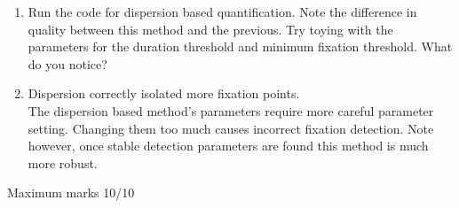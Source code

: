 \documentclass[12pt,english]{scrartcl}
\begin{document}
\begin{enumerate}
 \color{black}
 \item Run the code for dispersion based quantification. Note the difference in quality between this method and the previous. Try toying with the parameters for the duration threshold and minimum fixation threshold. What do you notice? \\
 \item[]
 \color{blue}
 Dispersion correctly isolated more fixation points. \\
 
 The dispersion based method's parameters require more careful parameter setting. Changing them too much causes incorrect fixation detection. Note however, once stable detection parameters are found this method is much more robust.
  

 \end{enumerate}
 \color{black}
 Maximum marks 10/10 \\
\end{document}
